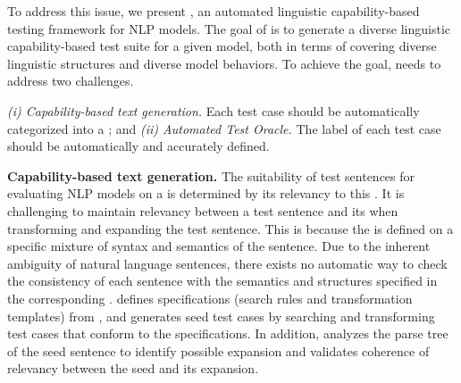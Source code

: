 




To address this issue, we present \tool, an automated linguistic
capability-based testing framework for NLP models.  The goal of \tool
is to generate a diverse linguistic capability-based test suite for a
given model, both in terms of covering diverse linguistic structures
and diverse model behaviors.  To achieve the goal, \tool needs to
address two challenges.


\textit{(i) Capability-based text generation.}
Each test case should be automatically categorized into a \lc; and
\textit{(ii) Automated Test Oracle.} The label of each test case
should be automatically and accurately defined.


\noindent \textbf{Capability-based text generation.} The suitability
of test sentences for evaluating NLP models on a \lc is determined by
its relevancy to this \lc. It is challenging to maintain relevancy
between a test sentence and its \lc when transforming and expanding
the test sentence. This is because the \lc is defined on a specific
mixture of syntax and semantics of the sentence. Due to the inherent
ambiguity of natural language sentences, there exists no automatic way
to check the consistency of each sentence with the semantics and
structures specified in the corresponding \lc. \tool defines
specifications (search rules and transformation templates) from \lcs,
and generates seed test cases by searching and transforming test cases
that conform to the specifications. In addition, \tool analyzes the
parse tree of the seed sentence to identify possible expansion and
validates coherence of \lc relevancy between the seed and its
expansion.

